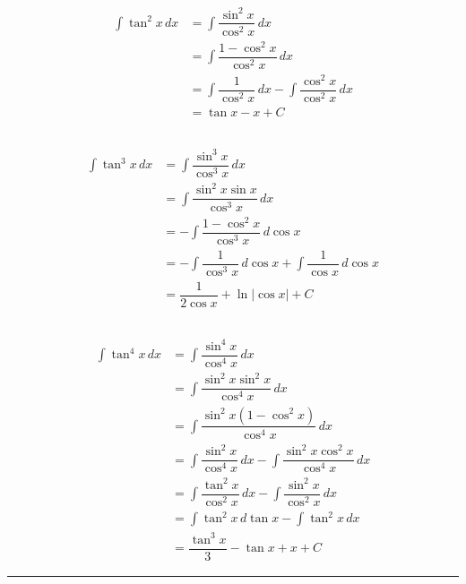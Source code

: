 \documentclass{scrartcl}
\begin{document}
\begin{align*}
\displaystyle \int \tan^2{x}\,dx
&= \int \dfrac{\sin^2{x}}{\cos^2{x}} \,dx\\
&= \int \dfrac{1-\cos^2{x}}{\cos^2{x}} \,dx\\
&= \int \dfrac{1}{\cos^2{x}} \,dx - \int \dfrac{\cos^2{x}}{\cos^2{x}} \,dx\\
&= \tan{x} - x + C
\end{align*}

\subsection{}

\begin{align*}
\displaystyle \int \tan^3{x}\,dx
&= \int \dfrac{\sin^3{x}}{\cos^3{x}} \,dx\\
&= \int \dfrac{\sin^2{x}\sin{x}}{\cos^3{x}} \,dx\\
&= -\int \dfrac{1-\cos^2{x}}{\cos^3{x}} \,d\cos{x}\\
&= -\int \dfrac{1}{\cos^3{x}} \,d\cos{x} + \int \dfrac{1}{\cos{x}} \,d\cos{x}\\
&= \dfrac{1}{2\cos{x}} + \ln{|\cos{x}|} + C
\end{align*}

\subsection{}

\begin{align*}
\displaystyle \int \tan^4{x}\,dx
&= \int \dfrac{\sin^4{x}}{\cos^4{x}} \,dx\\
&= \int \dfrac{\sin^2{x}\sin^2{x}}{\cos^4{x}} \,dx\\
&= \int \dfrac{\sin^2{x}(1-\cos^2{x})}{\cos^4{x}} \,dx\\
&= \int \dfrac{\sin^2{x}}{\cos^4{x}} \,dx - \int \dfrac{\sin^2{x}\cos^2{x}}{\cos^4{x}} \,dx\\
&= \int \dfrac{\tan^2{x}}{\cos^2{x}} \,dx - \int \dfrac{\sin^2{x}}{\cos^2{x}} \,dx\\
&= \int \tan^2{x} \,d\tan{x} - \int \tan^2{x} \,dx\\
&= \dfrac{\tan^3{x}}{3} - \tan{x} + x + C
\end{align*}

\hrule
\end{document}
